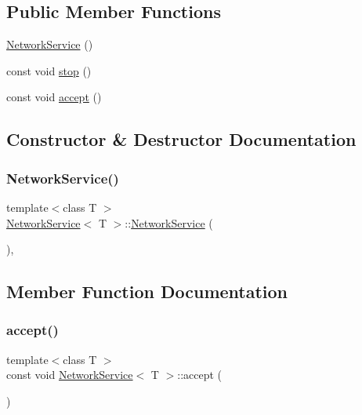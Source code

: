 \subsection*{Public Member Functions}
\begin{DoxyCompactItemize}
\item 
\mbox{\hyperlink{classNetworkService_ac6cdb1f63b3edc919725c5589f27cbfc}{Network\+Service}} ()
\item 
const void \mbox{\hyperlink{classNetworkService_a27bc847ca2e677729d2ca9cec06afeef}{stop}} ()
\item 
const void \mbox{\hyperlink{classNetworkService_aca54df714632e947253dc0d8184b23af}{accept}} ()
\end{DoxyCompactItemize}


\subsection{Constructor \& Destructor Documentation}
\mbox{\label{classNetworkService_ac6cdb1f63b3edc919725c5589f27cbfc}} 
\subsubsection{\texorpdfstring{Network\+Service()}{NetworkService()}}
{\footnotesize\ttfamily template$<$class T $>$ \\
\mbox{\hyperlink{classNetworkService}{Network\+Service}}$<$ T $>$\+::\mbox{\hyperlink{classNetworkService}{Network\+Service}} (\begin{DoxyParamCaption}{ }\end{DoxyParamCaption})\hspace{0.3cm}{\ttfamily [inline]}, {\ttfamily [explicit]}}



\subsection{Member Function Documentation}
\mbox{\label{classNetworkService_aca54df714632e947253dc0d8184b23af}} 
\subsubsection{\texorpdfstring{accept()}{accept()}}
{\footnotesize\ttfamily template$<$class T $>$ \\
const void \mbox{\hyperlink{classNetworkService}{Network\+Service}}$<$ T $>$\+::accept (\begin{DoxyParamCaption}{ }\end{DoxyParamCaption})\hspace{0.3cm}{\ttfamily [inline]}}

